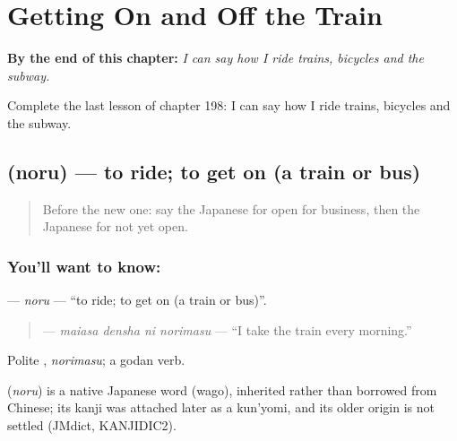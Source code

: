 
\chapter{Getting On and Off the Train}
\label{ch:ja-getting-on-and-off-the-train}

\begin{chapteropening}
\textbf{By the end of this chapter:} \emph{I can say how I ride trains, bicycles and the subway.}

Complete the last lesson of chapter 198: I can say how I ride trains, bicycles and the subway.
\end{chapteropening}

\section[\texorpdfstring{\ja{のる} (noru)}{のる (noru)}]{ (noru) — to ride; to get on (a train or bus)}

\label{lesson:JA-C198-noru}



\begin{quote}
Before the new one: say the Japanese for open for business, then the Japanese for not yet open.
\end{quote}

\subsection*{You'll want to know: }
\textbf{} — \emph{noru} — \textquotedblleft{}to ride; to get on (a train or bus)\textquotedblright{}.

\begin{quote}
\textbf{  } — \emph{maiasa densha ni norimasu} — \textquotedblleft{}I take the train every morning.\textquotedblright{}
\end{quote}

Polite \textbf{}, \emph{norimasu}; a godan verb.

\begin{cousinweb}
\textbf{} (\emph{noru}) is a native Japanese word (wago), inherited rather than borrowed from Chinese; its kanji was attached later as a kun'yomi, and its older origin is not settled (JMdict, KANJIDIC2).
\end{cousinweb}

